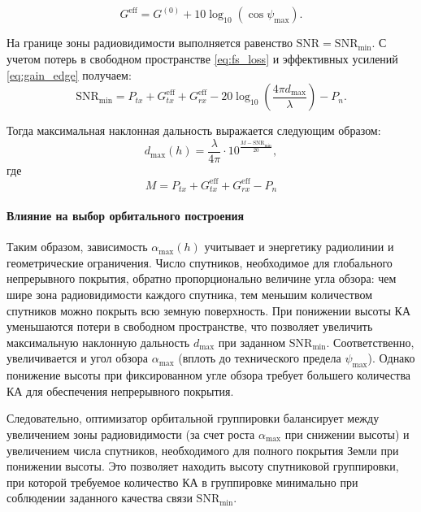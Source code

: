 \begin{equation}\label{eq:gain_edge}
G^{\text{eff}} = G^{(0)} + 10\log_{10}(\cos \psi_{\max}).
\end{equation}

На границе зоны радиовидимости выполняется равенство $\mathrm{SNR} =
\mathrm{SNR}_{\min}$. С учетом потерь в свободном пространстве \ref{eq:fs_loss} и
эффективных усилений \ref{eq:gain_edge} получаем:
\begin{equation}
\mathrm{SNR}_{\min} = P_{tx} + G_{tx}^{\text{eff}} + G_{rx}^{\text{eff}}
- 20\log_{10}\!\left(\frac{4\pi d_{\max}}{\lambda}\right) - P_{n}.
\end{equation}

Тогда максимальная наклонная дальность выражается следующим образом:
\begin{equation}
 d_{\max}(h) = \frac{\lambda}{4\pi} \cdot 10^{\frac{M -
 \mathrm{SNR}_{\min}}{20}},
\end{equation}
где
\begin{equation}
M = P_{tx} + G_{tx}^{\text{eff}} + G_{rx}^{\text{eff}} - P_{n}
\end{equation}


\paragraph{Влияние на выбор орбитального построения}

Таким образом, зависимость $\alpha_{\max}(h)$ учитывает и 
энергетику радиолинии и геометрические ограничения.
Число спутников, необходимое для глобального непрерывного покрытия,
обратно пропорционально величине угла обзора: чем шире зона радиовидимости
каждого спутника, тем меньшим количеством спутников можно покрыть всю
земную поверхность.
При понижении высоты КА уменьшаются потери в свободном
пространстве, что позволяет увеличить максимальную наклонную
дальность $d_{\max}$ при заданном $\mathrm{SNR}_{\min}$.
Соответственно, увеличивается и угол обзора $\alpha_{\max}$ (вплоть
до технического предела $\psi_{\max}$). 
Однако понижение высоты при фиксированном угле обзора требует
большего количества КА для обеспечения непрерывного покрытия. 

Следовательно, оптимизатор орбитальной группировки балансирует
между увеличением зоны радиовидимости (за счет
роста $\alpha_{\max}$ при снижении высоты) и увеличением числа
спутников, необходимого для полного покрытия Земли при понижении высоты. Это
позволяет находить высоту спутниковой группировки, при которой требуемое
количество КА в группировке минимально при соблюдении заданного
качества связи $\mathrm{SNR}_{\min}$.

